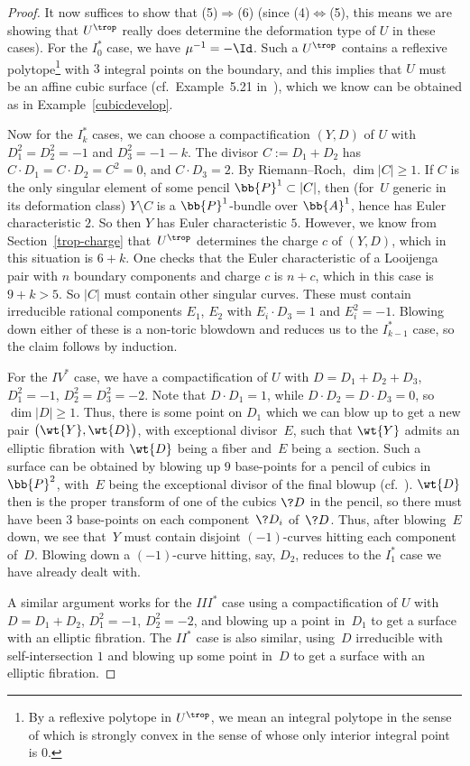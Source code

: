 \begin{proof}
It now suffices to show that (5)$\Rightarrow$(6) (since (4)$\Leftrightarrow$(5), this means we are showing that $U^{\trop}$ really does determine the deformation type of $U$ in these cases). For the $I_0^*$ case, we have $\mu^{-1}=-\Id$. Such a $U^{\trop}$ contains a reflexive polytope\footnote{By a reflexive polytope in $U^{\trop}$, we mean an integral polytope in the sense of \cite[Definition~2.10]{Man1} which is strongly convex in the sense of \cite[Definition~5.4]{Man1} whose only interior integral point is $0$.} with $3$ integral points on the boundary, and this implies that $U$ must be an affine cubic surface (cf.\ Example~5.21 in~\cite{Man1}), which we know can be obtained as in Example~\ref{cubicdevelop}.

Now for the $I_k^*$ cases, we can choose a compactification $(Y,D)$ of $U$ with $D_1^2=D_2^2=-1$ and $D_3^2=-1-k$. The divisor $C:=D_1+D_2$ has $C\cdot D_1=C\cdot D_2 = C^2 = 0$, and $C\cdot D_3 = 2$. By Riemann--Roch, $\dim |C|\geq 1$. If $C$ is the only singular element of some pencil $\bb{P}^1\subset |C|$, then (for~$U$ generic in its deformation class) $Y\setminus C$ is a $\bb{P}^1$-bundle over $\bb{A}^1$, hence has Euler characteristic $2$. So then $Y$ has Euler characteristic $5$. However, we know from Section~\ref{trop-charge} that~$U^{\trop}$ determines the charge $c$ of $(Y,D)$, which in this situation is $6+k$. One checks that the Euler characteristic of a Looijenga pair with $n$ boundary components and charge $c$ is $n+c$, which in this case is $9+k > 5$. So $|C|$ must contain other singular curves. These must contain irreducible rational components $E_1$, $E_2$ with $E_i\cdot D_3 = 1$ and $E_i^2=-1$. Blowing down either of these is a non-toric blowdown and reduces us to the $I_{k-1}^*$ case, so the claim follows by induction.

For the $IV^*$ case, we have a compactification of $U$ with $D=D_1+D_2+D_3$, $D_1^2=-1$, $D_2^2=D_3^2 = -2$. Note that $D\cdot D_1=1$, while $D\cdot D_2=D\cdot D_3 = 0$, so $\dim |D|\geq 1$. Thus, there is some point on $D_1$ which we can blow up to get a new pair $\big(\wt{Y},\wt{D}\big)$, with exceptional divisor~$E$, such that $\wt{Y}$ admits an elliptic fibration with $\wt{D}$ being a fiber and~$E$ being a~section. Such a surface can be obtained by blowing up $9$ base-points for a pencil of cubics in~$\bb{P}^2$, with~$E$ being the exceptional divisor of the final blowup (cf.~\cite{HL}). $\wt{D}$ then is the proper transform of one of the cubics $\?{D}$ in the pencil, so there must have been $3$ base-points on each component~$\?{D}_i$ of~$\?{D}$. Thus, after blowing~$E$ down, we see that~$Y$ must contain disjoint $(-1)$-curves hitting each component of~$D$. Blowing down a $(-1)$-curve hitting, say, $D_2$, reduces to the $I_1^*$ case we have already dealt with.

A similar argument works for the $III^*$ case using a compactification of $U$ with $D=D_1+D_2$, $D_1^2=-1$, $D_2^2 = -2$, and blowing up a point in~$D_1$ to get a surface with an elliptic fibration. The $II^*$ case is also similar, using~$D$ irreducible with self-intersection $1$ and blowing up some point in~$D$ to get a surface with an elliptic fibration.
\end{proof}

